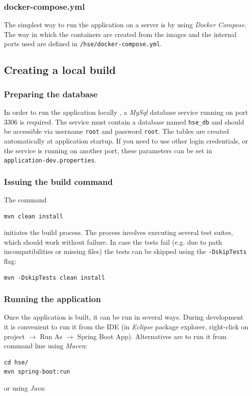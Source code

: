 \documentclass[fleqn]{article}
\begin{document}
\subsubsection{docker-compose.yml}

The simplest way to run the application on a server is by using \emph{Docker Compose}. The way in which the containers are created from the images
and the internal ports used are defined in 
\texttt{/hse/docker-compose.yml}.

\subsection{Creating a local build}

\subsubsection{Preparing the database}

In order to run the application locally , a \emph{MySql} database service running on port 3306 is required. The service must contain a database
named \texttt{hse\_db} and should be accessible via username \texttt{root} and password \texttt{root}. The tables
are created automatically at application startup. If you need to use other login credentials, or the service is running on another port, these
parameters can be set in \texttt{application-dev.properties}.

\subsubsection{Issuing the build command}

The command
\begin{verbatim}
mvn clean install
\end{verbatim}
initiates the build process. The process involves executing several test suites, which should work without failure. In case
the tests fail (e.g. due to path incompatibilities or missing files) the tests can be skipped using the \texttt{-DskipTests} flag:
\begin{verbatim}
mvn -DskipTests clean install
\end{verbatim}

\subsubsection{Running the application}

Once the application is built, it can be run in several ways. During development it is convenient to run it from the IDE (in
\emph{Eclipse} package explorer, right-click on project $\rightarrow$ Run As $\rightarrow$ Spring Boot App). Alternatives are to run it from command
line using \emph{Maven}:
\begin{verbatim}
cd hse/
mvn spring-boot:run
\end{verbatim}
or using \emph{Java}:
\end{document}
